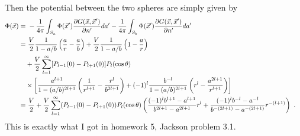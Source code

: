\documentclass[12pt]{article}
\begin{document}
Then the potential between the two spheres are simply given by
\begin{align}
    \Phi(\vec x) =&~ - \frac{1}{4\pi} \int_{S_a} \Phi(\vec x') \frac{\partial G(\vec x, \vec x')}{\partial n'} da' - \frac{1}{4\pi} \int_{S_b} \Phi(\vec x') \frac{\partial G(\vec x, \vec x')}{\partial n'}da'\cr
    =&~ \frac{V}{2} \frac{1}{1-a/b}\left(\frac{a}{r} - \frac{a}{b}\right) + \frac{V}{2} \frac{1}{1-a/b}\left(1 - \frac{a}{r}\right) \cr
    &+ \frac{V}{2} \sum_{l = 1}^\infty [P_{l-1}(0)-P_{l+1}(0)]P_l(\cos \theta) \cr
    & \times \left[\frac{a^{l+1}}{1-(a/b)^{2l+1}}\left(\frac{1}{r^{l+1}} - \frac{r^l}{b^{2l+1}}\right) + (-1)^l \frac{b^{-l}}{1-(a/b)^{2l+1}} \left(r^l - \frac{a^{2l+1}}{r^{l+1}}\right)\right]\cr
    =&~ \frac{V}{2} + \frac{V}{2}\sum_{l=1}^\infty(P_{l-1}(0) - P_{l+1}(0)) P_l(\cos\theta) \left(
        \frac{(-1)^l b^{l+1} - a^{l+1} }{b^{2l+1} - a^{2l+1} }r^l + \frac{(-1)^l b^{-l}-a^{-l} }{b^{-(2l+1)} - a^{-(2l+1)} } r^{-(l+1)}
    \right)~.\nonumber
\end{align}
This is exactly what I got in homework 5, Jackson problem 3.1.

\newpage
\end{document}
